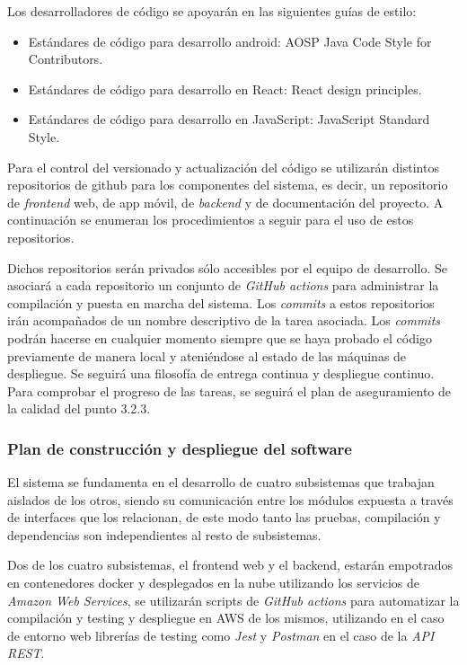 \documentclass{article}
\begin{document}
Los desarrolladores de código se apoyarán en las siguientes guías de estilo:

\begin{itemize}
    \item Estándares de código para desarrollo android: AOSP Java Code Style for Contributors.
    \item Estándares de código para desarrollo en React: React design principles.
    \item Estándares de código para desarrollo en JavaScript: JavaScript Standard Style.
\end{itemize}

Para el control del versionado y actualización del código se utilizarán distintos repositorios de github 
para los componentes del sistema, es decir, un repositorio de \textit{frontend} web, de app móvil, de \textit{backend} 
y de documentación del proyecto. A continuación se enumeran los procedimientos a seguir para el uso de estos repositorios.

Dichos repositorios serán privados sólo accesibles por el equipo de desarrollo.
Se asociará a cada repositorio un conjunto de \textit{GitHub actions} para administrar la compilación y 
puesta en marcha del sistema.
Los \textit{commits} a estos repositorios irán acompañados de un nombre descriptivo de la tarea asociada.
Los \textit{commits} podrán hacerse en cualquier momento siempre que se haya probado el código previamente 
de manera local y ateniéndose al estado de las máquinas de despliegue.
Se seguirá una filosofía de entrega continua y despliegue continuo.
Para comprobar el progreso de las tareas, se seguirá el plan de aseguramiento de la calidad del punto 3.2.3.

\subsubsection{Plan de construcción y despliegue del software}

El sistema se fundamenta en el desarrollo de cuatro subsistemas que trabajan aislados de los otros, 
siendo su comunicación entre los módulos expuesta a través de interfaces que los relacionan, de este modo 
tanto las pruebas, compilación y dependencias son independientes al resto de subsistemas. 

Dos de los cuatro subsistemas, el frontend web y el backend, estarán empotrados en contenedores docker y 
desplegados en la nube utilizando los servicios de \textit{Amazon Web Services}, se utilizarán scripts de 
\textit{GitHub actions} para automatizar la compilación y testing y despliegue en AWS de los mismos, 
utilizando en el caso de entorno web librerías de testing como \textit{Jest} y \textit{Postman} en el caso de la \textit{API REST}. 
\end{document}
